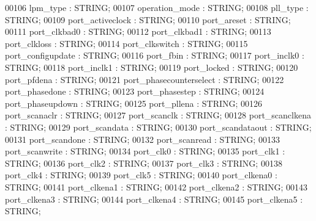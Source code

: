 \begin{DoxyCode}
{00106         lpm\_type        : \textcolor{comment}{STRING};
00107         operation\_mode      : \textcolor{comment}{STRING};
00108         pll\_type        : \textcolor{comment}{STRING};
00109         port\_activeclock        : \textcolor{comment}{STRING};
00110         port\_areset     : \textcolor{comment}{STRING};
00111         port\_clkbad0        : \textcolor{comment}{STRING};
00112         port\_clkbad1        : \textcolor{comment}{STRING};
00113         port\_clkloss        : \textcolor{comment}{STRING};
00114         port\_clkswitch      : \textcolor{comment}{STRING};
00115         port\_configupdate       : \textcolor{comment}{STRING};
00116         port\_fbin       : \textcolor{comment}{STRING};
00117         port\_inclk0     : \textcolor{comment}{STRING};
00118         port\_inclk1     : \textcolor{comment}{STRING};
00119         port\_locked     : \textcolor{comment}{STRING};
00120         port\_pfdena     : \textcolor{comment}{STRING};
00121         port\_phasecounterselect     : \textcolor{comment}{STRING};
00122         port\_phasedone      : \textcolor{comment}{STRING};
00123         port\_phasestep      : \textcolor{comment}{STRING};
00124         port\_phaseupdown        : \textcolor{comment}{STRING};
00125         port\_pllena     : \textcolor{comment}{STRING};
00126         port\_scanaclr       : \textcolor{comment}{STRING};
00127         port\_scanclk        : \textcolor{comment}{STRING};
00128         port\_scanclkena     : \textcolor{comment}{STRING};
00129         port\_scandata       : \textcolor{comment}{STRING};
00130         port\_scandataout        : \textcolor{comment}{STRING};
00131         port\_scandone       : \textcolor{comment}{STRING};
00132         port\_scanread       : \textcolor{comment}{STRING};
00133         port\_scanwrite      : \textcolor{comment}{STRING};
00134         port\_clk0       : \textcolor{comment}{STRING};
00135         port\_clk1       : \textcolor{comment}{STRING};
00136         port\_clk2       : \textcolor{comment}{STRING};
00137         port\_clk3       : \textcolor{comment}{STRING};
00138         port\_clk4       : \textcolor{comment}{STRING};
00139         port\_clk5       : \textcolor{comment}{STRING};
00140         port\_clkena0        : \textcolor{comment}{STRING};
00141         port\_clkena1        : \textcolor{comment}{STRING};
00142         port\_clkena2        : \textcolor{comment}{STRING};
00143         port\_clkena3        : \textcolor{comment}{STRING};
00144         port\_clkena4        : \textcolor{comment}{STRING};
00145         port\_clkena5        : \textcolor{comment}{STRING};
}
\end{DoxyCode}
